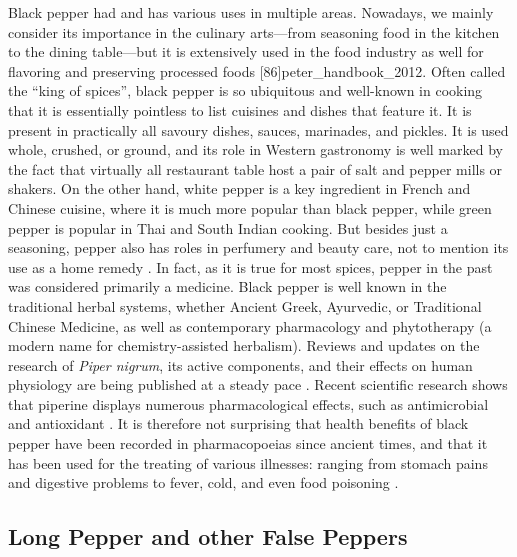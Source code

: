 Black pepper had and has various uses in multiple areas. Nowadays, we mainly consider its importance in the culinary arts---from seasoning food in the kitchen to the dining table---but it is extensively used in the food industry as well for flavoring and preserving processed foods [86]{peter_handbook_2012}.
Often called the ``king of spices'', black pepper is so ubiquitous and well-known in cooking that it is essentially pointless to list cuisines and dishes that feature it. It is present in practically all savoury dishes, sauces, marinades, and pickles. It is used whole, crushed, or ground, and its role in Western gastronomy is well marked by the fact that virtually all restaurant table host a pair of salt and pepper mills or shakers. On the other hand, white pepper is a key ingredient in French and Chinese cuisine, where it is much more popular than black pepper, while green pepper is popular in Thai and South Indian cooking. 
But besides just a seasoning, pepper also has roles in perfumery and beauty care, not to mention its use as a home remedy \autocite[467]{ravindran_black_2000}. In fact, as it is true for most spices, pepper in the past was considered primarily a medicine. Black pepper is well known in the traditional herbal systems, whether Ancient Greek, Ayurvedic, or Traditional Chinese Medicine, as well as contemporary pharmacology and phytotherapy (a modern name for chemistry-assisted herbalism). Reviews and updates on the research of \textit{Piper nigrum}, its active components, and their effects on human physiology are being published at a steady pace \autocite[see][]{srinivasan_black_2007, butt_black_2013, meghwal_piper_2013, haq_piperine_2021}. Recent scientific research shows that piperine displays numerous pharmacological effects, such as antimicrobial and antioxidant \autocite{haq_piperine_2021}. It is therefore not surprising that health benefits of black pepper have been recorded in pharmacopoeias since ancient times, and that it has been used for the treating of various illnesses: ranging from stomach pains and digestive problems to fever, cold, and even food poisoning \autocite[2952]{quattrocchi_crc_2014}.

\subsection{Long Pepper and other False Peppers}
\label{sec:long_pepper}


